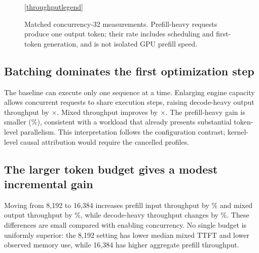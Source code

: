 \documentclass[10pt,a4paper]{article}
\begin{document}
\begin{figure}[h]
\centering
{}
\vspace{1mm}\ref{throughputlegend}
\caption{Matched concurrency-32 measurements. Prefill-heavy requests produce one
output token; their rate includes scheduling and first-token generation, and is
not isolated GPU prefill speed.}
\end{figure}

\subsection{Batching dominates the first optimization step}
The baseline can execute only one sequence at a time. Enlarging engine capacity
allows concurrent requests to share execution steps, raising decode-heavy output
throughput by \DecodeSpeedup{}$\times$. Mixed throughput improves by
\MixedSpeedup{}$\times$. The prefill-heavy gain is smaller
(\PrefillGain{}\%), consistent with a workload that already presents substantial
token-level parallelism. This interpretation follows the configuration contrast;
kernel-level causal attribution would require the cancelled profiles.

\subsection{The larger token budget gives a modest incremental gain}
Moving from 8,192 to 16,384 increases prefill input throughput by
\BudgetPrefillGain{}\% and mixed output throughput by \BudgetMixedGain{}\%,
while decode-heavy throughput changes by \BudgetDecodeChange{}\%.
These differences are small compared with enabling concurrency. No single
budget is uniformly superior: the 8,192 setting has lower median mixed TTFT and
lower observed memory use, while 16,384 has higher aggregate prefill throughput.
\end{document}
